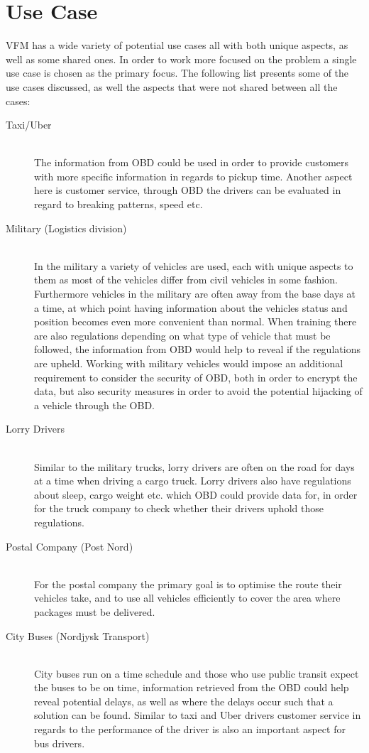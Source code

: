 \section{Use Case}
\acl{VFM} has a wide variety of potential use cases all with both unique aspects, as well as some shared ones.
In order to work more focused on the problem a single use case is chosen as the primary focus.
The following list presents some of the use cases discussed, as well the aspects that were not shared between all the cases:
\begin{description}
	\item [Taxi/Uber] \hfill \\
	The information from \ac{OBD} could be used in order to provide customers with more specific information in regards to pickup time.
	Another aspect here is customer service, through \ac{OBD} the drivers can be evaluated in regard to breaking patterns, speed etc.
	\item [Military (Logistics division)] \hfill \\
	In the military a variety of vehicles are used, each with unique aspects to them as most of the vehicles differ from civil vehicles in some fashion.
	Furthermore vehicles in the military are often away from the base days at a time, at which point having information about the vehicles status and position becomes even more convenient than normal.
	When training there are also regulations depending on what type of vehicle that must be followed, the information from \ac{OBD} would help to reveal if the regulations are upheld.
	Working with military vehicles would impose an additional requirement to consider the security of \ac{OBD}, both in order to encrypt the data, but also security measures in order to avoid the potential hijacking of a vehicle through the \ac{OBD}.
	\item [Lorry Drivers] \hfill \\
	Similar to the military trucks, lorry drivers are often on the road for days at a time when driving a cargo truck.
	Lorry drivers also have regulations about sleep, cargo weight etc. which \ac{OBD} could provide data for, in order for the truck company to check whether their drivers uphold those regulations.
	\item [Postal Company (Post Nord)] \hfill \\
	For the postal company the primary goal is to optimise the route their vehicles take, and to use all vehicles efficiently to cover the area where packages must be delivered.
	\item [City Buses (Nordjysk Transport)] \hfill \\
	City buses run on a time schedule and those who use public transit expect the buses to be on time, information retrieved from the \ac{OBD} could help reveal potential delays, as well as where the delays occur such that a solution can be found.
	Similar to taxi and Uber drivers customer service in regards to the performance of the driver is also an important aspect for bus drivers.
\end{description}

